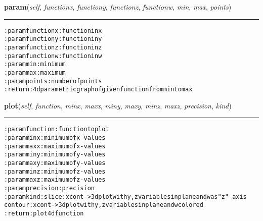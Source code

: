    \vspace{0.5ex}

\hspace{.8\funcindent}\begin{boxedminipage}{\funcwidth}

    \raggedright \textbf{param}(\textit{self}, \textit{functionx}, \textit{functiony}, \textit{functionz}, \textit{functionw}, \textit{min}, \textit{max}, \textit{points})

    \vspace{-1.5ex}

    \rule{\textwidth}{0.5\fboxrule}
\setlength{\parskip}{2ex}
\begin{alltt}

:param functionx: function in x
:param functiony: function in y
:param functionz: function in z
:param functionw: function in w
:param min: minimum
:param max: maximum
:param points: number of points
:return: 4d parametric graph of given function from min to max
\end{alltt}

\setlength{\parskip}{1ex}
    \end{boxedminipage}

    \label{hal:maths:plotter:Plot4d:plot}

    \vspace{0.5ex}

\hspace{.8\funcindent}\begin{boxedminipage}{\funcwidth}

    \raggedright \textbf{plot}(\textit{self}, \textit{function}, \textit{minx}, \textit{maxx}, \textit{miny}, \textit{maxy}, \textit{minz}, \textit{maxz}, \textit{precision}, \textit{kind})

    \vspace{-1.5ex}

    \rule{\textwidth}{0.5\fboxrule}
\setlength{\parskip}{2ex}
\begin{alltt}

:param function: function to plot
:param minx: minimum of x-values
:param maxx: maximum of x-values
:param miny: minimum of y-values
:param maxy: maximum of y-values
:param minz: minimum of z-values
:param maxz: maximum of z-values
:param precision: precision
:param kind: slice: x cont -{\textgreater} 3d plot with y,z variables in plane and w as "z"-axis
             contour: x cont -{\textgreater} 3d plot with y,z variables in plane and w colored
:return: plot 4d function
\end{alltt}

\setlength{\parskip}{1ex}
    \end{boxedminipage}


